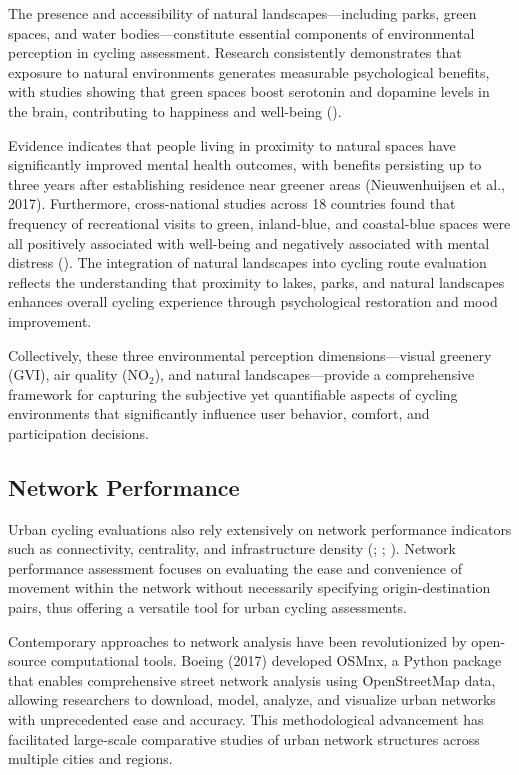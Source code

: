 \documentclass[
  12pt,
  oneside]{book}
\begin{document}
The presence and accessibility of natural landscapes---including parks, green spaces, and water bodies---constitute essential components of environmental perception in cycling assessment. Research consistently demonstrates that exposure to natural environments generates measurable psychological benefits, with studies showing that green spaces boost serotonin and dopamine levels in the brain, contributing to happiness and well-being (\textcite{lee_health_2011}).

Evidence indicates that people living in proximity to natural spaces have significantly improved mental health outcomes, with benefits persisting up to three years after establishing residence near greener areas (Nieuwenhuijsen et al., 2017). Furthermore, cross-national studies across 18 countries found that frequency of recreational visits to green, inland-blue, and coastal-blue spaces were all positively associated with well-being and negatively associated with mental distress (\textcite{hooyberg_general_2020}). The integration of natural landscapes into cycling route evaluation reflects the understanding that proximity to lakes, parks, and natural landscapes enhances overall cycling experience through psychological restoration and mood improvement.

Collectively, these three environmental perception dimensions---visual greenery (GVI), air quality (NO\(_2\)), and natural landscapes---provide a comprehensive framework for capturing the subjective yet quantifiable aspects of cycling environments that significantly influence user behavior, comfort, and participation decisions.

\subsection{Network Performance}\label{network-performance}

Urban cycling evaluations also rely extensively on network performance indicators such as connectivity, centrality, and infrastructure density (\textcite{lowry_assessment_2012}; \textcite{geurs_multi-modal_2016}; \textcite{buehler_bikeway_2016}). Network performance assessment focuses on evaluating the ease and convenience of movement within the network without necessarily specifying origin-destination pairs, thus offering a versatile tool for urban cycling assessments.

Contemporary approaches to network analysis have been revolutionized by open-source computational tools. Boeing (2017) developed OSMnx, a Python package that enables comprehensive street network analysis using OpenStreetMap data, allowing researchers to download, model, analyze, and visualize urban networks with unprecedented ease and accuracy. This methodological advancement has facilitated large-scale comparative studies of urban network structures across multiple cities and regions.
\end{document}
